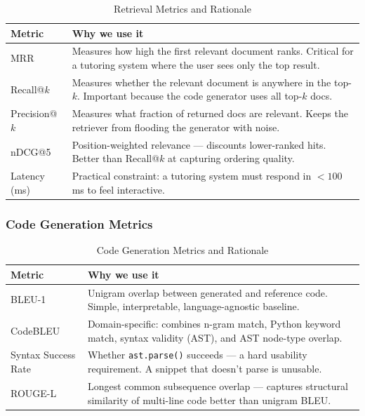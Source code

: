 \documentclass[12pt,a4paper]{article}
\begin{document}
\begin{table}[h!]
\centering
\caption{Retrieval Metrics and Rationale}
\small
\begin{tabularx}{\textwidth}{lX}
\toprule
Metric & Why we use it \\
\midrule
MRR & Measures how high the first relevant document ranks. Critical for a tutoring system where the user sees only the top result. \\
Recall@$k$ & Measures whether the relevant document is anywhere in the top-$k$. Important because the code generator uses all top-$k$ docs. \\
Precision@$k$ & Measures what fraction of returned docs are relevant. Keeps the retriever from flooding the generator with noise. \\
nDCG@5 & Position-weighted relevance --- discounts lower-ranked hits. Better than Recall@$k$ at capturing ordering quality. \\
Latency (ms) & Practical constraint: a tutoring system must respond in $<100$\,ms to feel interactive. \\
\bottomrule
\end{tabularx}
\end{table}

\subsubsection{Code Generation Metrics}

\begin{table}[h!]
\centering
\caption{Code Generation Metrics and Rationale}
\small
\begin{tabularx}{\textwidth}{lX}
\toprule
Metric & Why we use it \\
\midrule
BLEU-1 & Unigram overlap between generated and reference code. Simple, interpretable, language-agnostic baseline. \\
CodeBLEU & Domain-specific: combines n-gram match, Python keyword match, syntax validity (AST), and AST node-type overlap. \\
Syntax Success Rate & Whether \texttt{ast.parse()} succeeds --- a hard usability requirement. A snippet that doesn't parse is unusable. \\
ROUGE-L & Longest common subsequence overlap --- captures structural similarity of multi-line code better than unigram BLEU. \\
\bottomrule
\end{tabularx}
\end{table}
\end{document}

